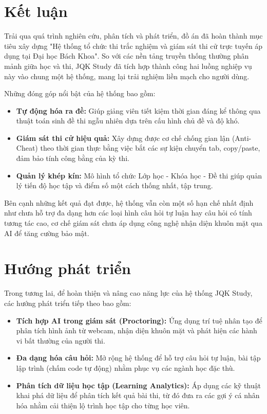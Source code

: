 \documentclass[../DoAn.tex]{subfiles}
\begin{document}
\section{Kết luận}
Trải qua quá trình nghiên cứu, phân tích và phát triển, đồ án đã hoàn thành mục tiêu xây dựng "Hệ thống tổ chức thi trắc nghiệm và giám sát thi cử trực tuyến áp dụng tại Đại học Bách Khoa". So với các nền tảng truyền thống thường phân mảnh giữa học và thi, JQK Study đã tích hợp thành công hai luồng nghiệp vụ này vào chung một hệ thống, mang lại trải nghiệm liền mạch cho người dùng.

Những đóng góp nổi bật của hệ thống bao gồm:
\begin{itemize}
    \item \textbf{Tự động hóa ra đề:} Giúp giảng viên tiết kiệm thời gian đáng kể thông qua thuật toán sinh đề thi ngẫu nhiên dựa trên cấu hình chủ đề và độ khó.
    \item \textbf{Giám sát thi cử hiệu quả:} Xây dựng được cơ chế chống gian lận (Anti-Cheat) theo thời gian thực bằng việc bắt các sự kiện chuyển tab, copy/paste, đảm bảo tính công bằng của kỳ thi.
    \item \textbf{Quản lý khép kín:} Mô hình tổ chức Lớp học - Khóa học - Đề thi giúp quản lý tiến độ học tập và điểm số một cách thống nhất, tập trung.
\end{itemize}

Bên cạnh những kết quả đạt được, hệ thống vẫn còn một số hạn chế nhất định như chưa hỗ trợ đa dạng hơn các loại hình câu hỏi tự luận hay câu hỏi có tính tương tác cao, cơ chế giám sát chưa áp dụng công nghệ nhận diện khuôn mặt qua AI để tăng cường bảo mật.

\section{Hướng phát triển}
Trong tương lai, để hoàn thiện và nâng cao năng lực của hệ thống JQK Study, các hướng phát triển tiếp theo bao gồm:
\begin{itemize}
    \item \textbf{Tích hợp AI trong giám sát (Proctoring):} Ứng dụng trí tuệ nhân tạo để phân tích hình ảnh từ webcam, nhận diện khuôn mặt và phát hiện các hành vi bất thường của người thi.
    \item \textbf{Đa dạng hóa câu hỏi:} Mở rộng hệ thống để hỗ trợ câu hỏi tự luận, bài tập lập trình (chấm code tự động) nhằm phục vụ các ngành học đặc thù.
    \item \textbf{Phân tích dữ liệu học tập (Learning Analytics):} Áp dụng các kỹ thuật khai phá dữ liệu để phân tích kết quả bài thi, từ đó đưa ra các gợi ý cá nhân hóa nhằm cải thiện lộ trình học tập cho từng học viên.
\end{itemize}
\end{document}
